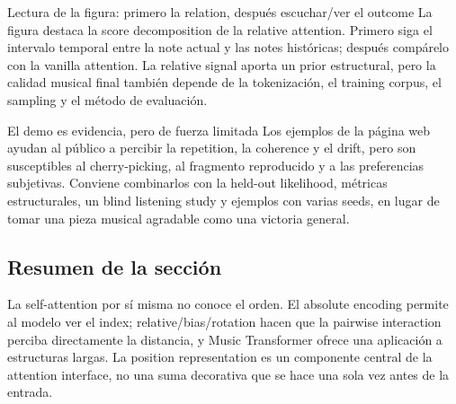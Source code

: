 
\begin{knowledgebox}{Lectura de la figura: primero la relation, después escuchar/ver el outcome}
La figura destaca la score decomposition de la relative attention. Primero siga el intervalo temporal entre la note actual y las notes históricas; después compárelo con la vanilla attention. La relative signal aporta un prior estructural, pero la calidad musical final también depende de la tokenización, el training corpus, el sampling y el método de evaluación.
\end{knowledgebox}


\begin{warningbox}{El demo es evidencia, pero de fuerza limitada}
Los ejemplos de la página web ayudan al público a percibir la repetition, la coherence y el drift, pero son susceptibles al cherry-picking, al fragmento reproducido y a las preferencias subjetivas. Conviene combinarlos con la held-out likelihood, métricas estructurales, un blind listening study y ejemplos con varias seeds, en lugar de tomar una pieza musical agradable como una victoria general.
\end{warningbox}


\subsection{Resumen de la sección}

La self-attention por sí misma no conoce el orden. El absolute encoding permite al modelo ver el index; relative/bias/rotation hacen que la pairwise interaction perciba directamente la distancia, y Music Transformer ofrece una aplicación a estructuras largas. La position representation es un componente central de la attention interface, no una suma decorativa que se hace una sola vez antes de la entrada.

